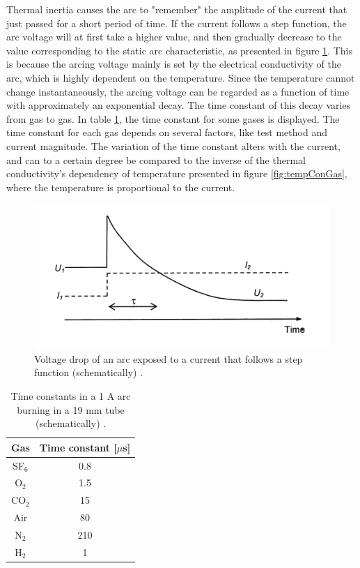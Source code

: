 \documentclass[10pt,b5paper,twoside]{article}
\begin{document}
Thermal inertia causes the arc to "remember" the amplitude of the current that just passed for a short period of time. If the current follows a step function, the arc voltage will at first take a higher value, and then gradually decrease to the value corresponding to the static arc characteristic, as presented in figure \ref{fig:timeConstantStep}. This is because the arcing voltage mainly is set by the electrical conductivity of the arc, which is highly dependent on the temperature. Since the temperature cannot change instantaneously, the arcing voltage can be regarded as a function of time with approximately an exponential decay. The time constant of this decay varies from gas to gas. In table \ref{tab:timeConstants}, the time constant for some gases is displayed. The time constant for each gas depends on several factors, like test method and current magnitude. The variation of the time constant alters with the current, and can to a certain degree be compared to the inverse of the thermal conductivity's dependency of temperature presented in figure \ref{fig:tempConGas}, where the temperature is proportional to the current. 

\begin{figure}[H]
\centering
\includegraphics[scale=1]{Bilder/Theory/timeConstants.png}
\caption{Voltage drop of an arc exposed to a current that follows a step function (schematically) \cite{bib:HVEbreak}.} \label{fig:timeConstantStep}
\end{figure}

\begin{table}[H]
\center
\caption{Time constants in a 1 A arc burning in a 19 mm tube (schematically) \cite{bib:HVEbreak}. }
\begin{tabular}{|c|c|}
\hline 
Gas & Time constant [$\mu$s] \\ 
\hline 
SF$_6$ & 0.8 \\ 
\hline
O$_2$ & 1.5 \\
\hline
CO$_2$ & 15 \\
\hline
Air & 80 \\
\hline
N$_2$ & 210 \\
\hline
H$_2$ & 1 \\
\hline
\end{tabular} 
\label{tab:timeConstants}
\end{table}
\end{document}
